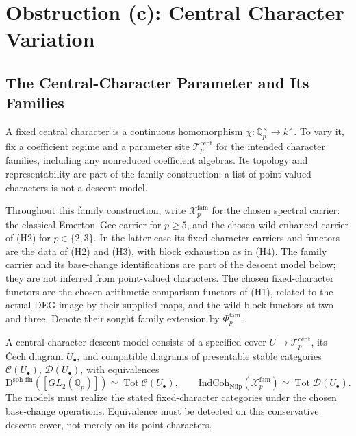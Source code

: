 \section{Obstruction (c): Central Character Variation}
\label{v4-arith:deg-f1a:central-char}

\subsection{The Central-Character Parameter and Its Families}
A fixed central character is a continuous homomorphism
\(\chi:\mathbb Q_p^\times\to k^\times\). To vary it, fix a
coefficient regime and a parameter site \(\mathcal T_p^{\mathrm{cent}}\)
for the intended character families, including any nonreduced
coefficient algebras. Its topology and representability are part
of the family construction; a list of point-valued characters
is not a descent model.

Throughout this family construction, write \(\mathcal X_p^{\mathrm{fam}}\)
for the chosen spectral carrier: the classical Emerton--Gee carrier
for \(p\geq5\), and the chosen wild-enhanced carrier of (H2) for
\(p\in\{2,3\}\). In the latter case its fixed-character carriers
and functors are the data of (H2) and (H3), with block exhaustion
as in (H4). The family carrier and its base-change identifications
are part of the descent model below; they are not inferred from
point-valued characters. The chosen fixed-character functors are
the chosen arithmetic comparison functors of (H1), related to the
actual DEG image by their supplied maps, and the
wild block functors at two and three. Denote their sought family
extension by \(\Phi_p^{\mathrm{fam}}\).

\begin{definition}
\label{v4-arith:deg-f1a:def:central-char-family}
A central-character descent model consists of a specified cover
\(U\to\mathcal T_p^{\mathrm{cent}}\), its \v{C}ech diagram
\(U_\bullet\), and compatible diagrams of presentable stable
categories \(\mathcal C(U_\bullet)\), \(\mathcal D(U_\bullet)\),
with equivalences
\[
 \mathrm D^{\mathrm{sph\text{-}fin}}([GL_2(\mathbb Q_p)])
 \simeq\operatorname{Tot}\mathcal C(U_\bullet),\qquad
 \mathrm{IndCoh}_{\mathrm{Nilp}}(\mathcal X_p^{\mathrm{fam}})
 \simeq\operatorname{Tot}\mathcal D(U_\bullet).
\]
The models must realize the stated fixed-character categories
under the chosen base-change operations. Equivalence must be
detected on this conservative descent cover, not merely on its
point characters.
\end{definition}

